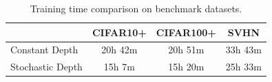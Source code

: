 
\begin{table}[t!]
\label{table.training_time}
\caption{Training time comparison on benchmark datasets.}
\begin{center}
\resizebox{0.65\textwidth}{!}
{
\begin{small}
\begin{tabular}{lccc}
\hline
		  	& CIFAR10+   & CIFAR100+   & SVHN	\\
\hline
Constant Depth		
		    & 20h 42m    & 20h 51m	   & 33h 43m \\
Stochastic Depth
			& 15h 7m	 & 15h 20m	   & 25h 33m \\
\hline
\end{tabular}
\end{small}
}
\vspace{-5ex}
\end{center}
\end{table} 